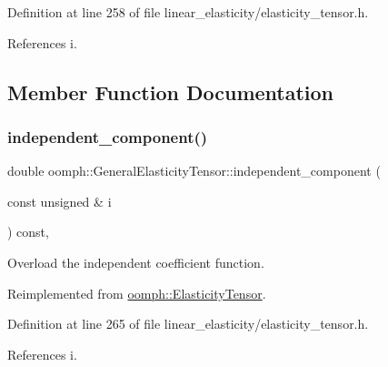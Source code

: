 Definition at line 258 of file linear\+\_\+elasticity/elasticity\+\_\+tensor.\+h.



References i.



\subsection{Member Function Documentation}
\mbox{\label{classoomph_1_1GeneralElasticityTensor_a01443522709af3e2f1af63411be4f0e6}} 
\subsubsection{\texorpdfstring{independent\+\_\+component()}{independent\_component()}}
{\footnotesize\ttfamily double oomph\+::\+General\+Elasticity\+Tensor\+::independent\+\_\+component (\begin{DoxyParamCaption}\item[{const unsigned \&}]{i }\end{DoxyParamCaption}) const\hspace{0.3cm}{\ttfamily [inline]}, {\ttfamily [virtual]}}



Overload the independent coefficient function. 



Reimplemented from \hyperlink{classoomph_1_1ElasticityTensor_a84b2a9b7a447cf88b2d6b98b5e6e7bd5}{oomph\+::\+Elasticity\+Tensor}.



Definition at line 265 of file linear\+\_\+elasticity/elasticity\+\_\+tensor.\+h.



References i.

\mbox{\label{classoomph_1_1GeneralElasticityTensor_aa8dee57c5a1315f790401628ece5ec26}} 
